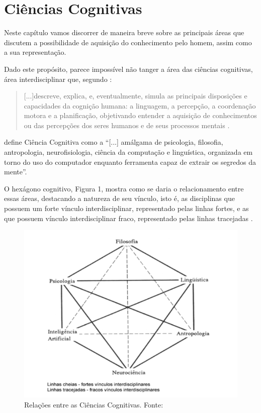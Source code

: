\chapter{\hspace*{3pt} Ciências Cognitivas}

Neste capítulo vamos discorrer de maneira breve sobre as principais áreas que discutem a possibilidade de aquisição do conhecimento pelo homem, assim como a sua representação.

Dado este propósito, parece impossível não tanger a área das ciências cognitivas, área interdisciplinar que, segundo :
\begin{quote}
[...]descreve, explica, e, eventualmente, simula as principais disposições e capacidades da cognição humana: a linguagem, a percepção, a coordenação motora e a planificação, objetivando entender a aquisição de conhecimentos ou das percepções dos seres humanos e de seus processos mentais \cite{lacerda:2012.linguagem}.
\end{quote}
 define Ciência Cognitiva como a ``[...] amálgama de psicologia, filosofia, antropologia, neurofisiologia, ciência da computação e linguística, organizada em torno do uso do computador enquanto ferramenta capaz de extrair os segredos da mente”.

O hexágono cognitivo, Figura 1, mostra como se daria o relacionamento entre essas áreas, destacando a natureza de seu vínculo, isto é, as disciplinas que possuem um forte vínculo interdisciplinar, representado pelas linhas fortes, e as que possuem vínculo interdisciplinar fraco, representado pelas linhas tracejadas \cite{lacerda:2012.linguagem}.

\begin{figure}
    \centering
    \includegraphics[width=\textwidth]{imagens/hexagono_cognitivo.png}
    \caption{Relações entre as Ciências Cognitivas. Fonte: }
    \label{fig:hexagono_cognitivo}
\end{figure}


